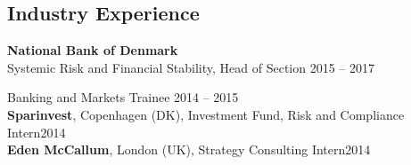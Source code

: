 \documentclass[11pt]{res} %
\newcommand{\fullhrulefill}{%
  \vspace{-1ex}%
  \hspace*{-\sectionwidth}\hrulefill%
  }
\begin{document}
\begin{resume}
\vspace{0.2in} %

\section{Industry Experience}
\fullhrulefill \newline
%
{\bf National Bank of Denmark}\\
Systemic Risk and Financial Stability, Head of Section \hfill 2015 -- 2017

\vspace{-12pt} %

Banking and Markets Trainee \hfill 2014 -- 2015\\
{\bf Sparinvest}, Copenhagen (DK), Investment Fund, Risk and Compliance Intern\hfill 2014\\
{\bf Eden McCallum}, London (UK), Strategy Consulting Intern\hfill 2014


\vspace{0.2in} %

%


\end{resume}
\end{document}
